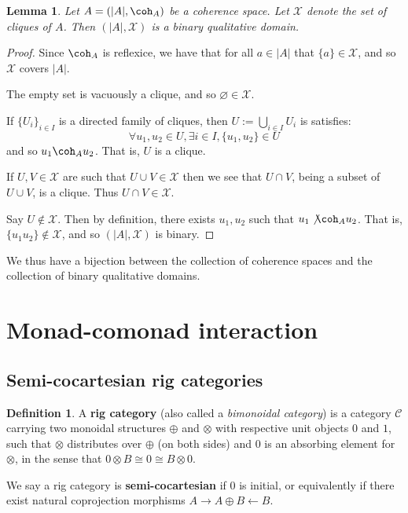\documentclass[12pt]{article}
\theoremstyle{plain}
\newtheorem{lemma}[thm]{Lemma}
\theoremstyle{definition}
\newtheorem{defn}[thm]{Definition} %
\newcommand{\scr}[1]{\mathscr{#1}}
\newcommand{\call}[1]{\mathcal{#1}}
\newcommand{\Ccal}{\call{C}}
\begin{document}
	\begin{lemma}
		Let $A = (|A|, \coh_A)$ be a coherence space. Let $\scr{X}$ denote the set of cliques of $A$. Then $(|A|, \scr{X})$ is a binary qualitative domain.
		\end{lemma}
	\begin{proof}
		Since $\coh_A$ is reflexice, we have that for all $a \in |A|$ that $\{ a \} \in \scr{X}$, and so $\scr{X}$ covers $|A|$.
		
		The empty set is vacuously a clique, and so $\varnothing \in \scr{X}$.
		
		If $\{ U_i \}_{i \in I}$ is a directed family of cliques, then $U := \bigcup_{i \in I}U_i$ is satisfies:
		\begin{equation}
			\forall u_1, u_2 \in U, \exists i \in I, \{ u_1, u_2 \} \in U
			\end{equation}
		and so $u_1 \coh_A u_2$. That is, $U$ is a clique.
		
		If $U,V \in \scr{X}$ are such that $U \cup V \in \scr{X}$ then we see that $U \cap V$, being a subset of $U \cup V$, is a clique. Thus $U \cap V \in \scr{X}$.
		
		Say $U \not\in \scr{X}$. Then by definition, there exists $u_1, u_2$ such that $u_1 \not\coh_A u_2$. That is, $\{ u_1 u_2 \} \not\in \scr{X}$, and so $(|A|,\scr{X})$ is binary.
		\end{proof}
	We thus have a bijection between the collection of coherence spaces and the collection of binary qualitative domains.


\section{Monad-comonad interaction}

\subsection{Semi-cocartesian rig categories}

\begin{defn}
A \textbf{rig category} (also called a \textit{bimonoidal category}) is a category $\Ccal$ carrying two monoidal structures ${\oplus}$ and ${\otimes}$ with respective unit objects $0$ and $1$, such that ${\otimes}$ distributes over ${\oplus}$ (on both sides) and $0$ is an absorbing element for ${\otimes}$, in the sense that $0 \otimes B \cong 0 \cong B \otimes 0$.

We say a rig category is \textbf{semi-cocartesian} if $0$ is initial, or equivalently if there exist natural coprojection morphisms $A \rightarrow A \oplus B \leftarrow B$.
\end{defn}
\end{document}
